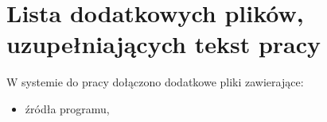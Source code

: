 \chapter{Lista dodatkowych plików, uzupełniających tekst pracy} 

W systemie do pracy dołączono dodatkowe pliki zawierające:
\begin{itemize}
\item źródła programu,
\end{itemize}
